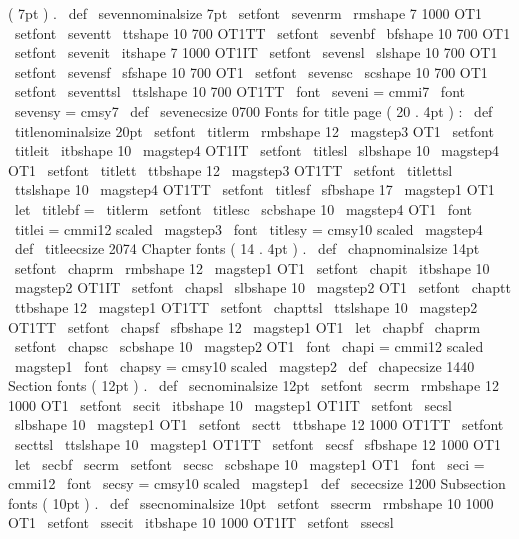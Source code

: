 {{{{(
7pt
)
.
\
def
\
sevennominalsize
{
7pt
}
\
setfont
\
sevenrm
\
rmshape
{
7
}
{
1000
}
{
OT1
}
\
setfont
\
seventt
\
ttshape
{
10
}
{
700
}
{
OT1TT
}
\
setfont
\
sevenbf
\
bfshape
{
10
}
{
700
}
{
OT1
}
\
setfont
\
sevenit
\
itshape
{
7
}
{
1000
}
{
OT1IT
}
\
setfont
\
sevensl
\
slshape
{
10
}
{
700
}
{
OT1
}
\
setfont
\
sevensf
\
sfshape
{
10
}
{
700
}
{
OT1
}
\
setfont
\
sevensc
\
scshape
{
10
}
{
700
}
{
OT1
}
\
setfont
\
seventtsl
\
ttslshape
{
10
}
{
700
}
{
OT1TT
}
\
font
\
seveni
=
cmmi7
\
font
\
sevensy
=
cmsy7
\
def
\
sevenecsize
{
0700
}
%
Fonts
for
title
page
(
20
.
4pt
)
:
\
def
\
titlenominalsize
{
20pt
}
\
setfont
\
titlerm
\
rmbshape
{
12
}
{
\
magstep3
}
{
OT1
}
\
setfont
\
titleit
\
itbshape
{
10
}
{
\
magstep4
}
{
OT1IT
}
\
setfont
\
titlesl
\
slbshape
{
10
}
{
\
magstep4
}
{
OT1
}
\
setfont
\
titlett
\
ttbshape
{
12
}
{
\
magstep3
}
{
OT1TT
}
\
setfont
\
titlettsl
\
ttslshape
{
10
}
{
\
magstep4
}
{
OT1TT
}
\
setfont
\
titlesf
\
sfbshape
{
17
}
{
\
magstep1
}
{
OT1
}
\
let
\
titlebf
=
\
titlerm
\
setfont
\
titlesc
\
scbshape
{
10
}
{
\
magstep4
}
{
OT1
}
\
font
\
titlei
=
cmmi12
scaled
\
magstep3
\
font
\
titlesy
=
cmsy10
scaled
\
magstep4
\
def
\
titleecsize
{
2074
}
%
Chapter
fonts
(
14
.
4pt
)
.
\
def
\
chapnominalsize
{
14pt
}
\
setfont
\
chaprm
\
rmbshape
{
12
}
{
\
magstep1
}
{
OT1
}
\
setfont
\
chapit
\
itbshape
{
10
}
{
\
magstep2
}
{
OT1IT
}
\
setfont
\
chapsl
\
slbshape
{
10
}
{
\
magstep2
}
{
OT1
}
\
setfont
\
chaptt
\
ttbshape
{
12
}
{
\
magstep1
}
{
OT1TT
}
\
setfont
\
chapttsl
\
ttslshape
{
10
}
{
\
magstep2
}
{
OT1TT
}
\
setfont
\
chapsf
\
sfbshape
{
12
}
{
\
magstep1
}
{
OT1
}
\
let
\
chapbf
\
chaprm
\
setfont
\
chapsc
\
scbshape
{
10
}
{
\
magstep2
}
{
OT1
}
\
font
\
chapi
=
cmmi12
scaled
\
magstep1
\
font
\
chapsy
=
cmsy10
scaled
\
magstep2
\
def
\
chapecsize
{
1440
}
%
Section
fonts
(
12pt
)
.
\
def
\
secnominalsize
{
12pt
}
\
setfont
\
secrm
\
rmbshape
{
12
}
{
1000
}
{
OT1
}
\
setfont
\
secit
\
itbshape
{
10
}
{
\
magstep1
}
{
OT1IT
}
\
setfont
\
secsl
\
slbshape
{
10
}
{
\
magstep1
}
{
OT1
}
\
setfont
\
sectt
\
ttbshape
{
12
}
{
1000
}
{
OT1TT
}
\
setfont
\
secttsl
\
ttslshape
{
10
}
{
\
magstep1
}
{
OT1TT
}
\
setfont
\
secsf
\
sfbshape
{
12
}
{
1000
}
{
OT1
}
\
let
\
secbf
\
secrm
\
setfont
\
secsc
\
scbshape
{
10
}
{
\
magstep1
}
{
OT1
}
\
font
\
seci
=
cmmi12
\
font
\
secsy
=
cmsy10
scaled
\
magstep1
\
def
\
sececsize
{
1200
}
%
Subsection
fonts
(
10pt
)
.
\
def
\
ssecnominalsize
{
10pt
}
\
setfont
\
ssecrm
\
rmbshape
{
10
}
{
1000
}
{
OT1
}
\
setfont
\
ssecit
\
itbshape
{
10
}
{
1000
}
{
OT1IT
}
\
setfont
\
ssecsl
}}}}
